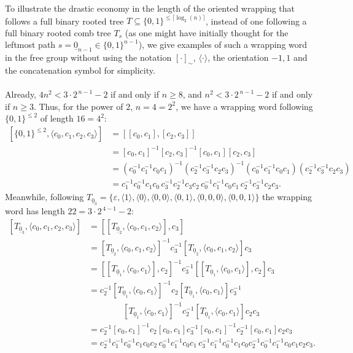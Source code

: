 \documentclass[11pt, a4paper, oneside]{article}
\theoremstyle{remark}
\theoremstyle{lemma}
\begin{document}
To illustrate the drastic economy in the length of the oriented wrapping that follows a full binary rooted tree \(T \subseteq \{0,1\}^{\leq \lceil \log_2(n) \rceil}\), instead of one following a full binary rooted comb tree \(T_s\) (as one might have initially thought for the leftmost path \(s = \underline{0}_{n-1} \in \{0,1\}^{n-1}\)), we give examples of such a wrapping word in the free group without using the notation \([\cdot]_{\sim}\), \(\langle \cdot \rangle\), the orientation \(-1,1\) and the concatenation symbol for simplicity. 
\\\\
Already, \(4n^2 < 3 \cdot 2^{\,n-1} - 2\) if and only if \(n \geq 8\), and \(n^2 < 3 \cdot 2^{\,n-1} - 2\) if and only if \(n \geq 3\). Thus, for the power of \(2\), \(n = 4 = 2^2\), we have a wrapping word following \(\{0,1\}^{\leq 2}\) of length \(16 = 4^2\):
\begin{align*}
\left[\{0,1\}^{\leq 2}, \langle c_0,c_1,c_2,c_3\rangle\right] 
&= [[c_0,c_1],[c_2,c_3]] \\
&= [c_0,c_1]^{-1}[c_2,c_3]^{-1}[c_0,c_1][c_2,c_3] \\
&= (c_0^{-1}c_1^{-1}c_0c_1)^{-1}(c_2^{-1}c_3^{-1}c_2c_3)^{-1}(c_0^{-1}c_1^{-1}c_0c_1)(c_2^{-1}c_3^{-1}c_2c_3) \\
&= c_1^{-1}c_0^{-1}c_1c_0 \, c_3^{-1}c_2^{-1}c_3c_2 \, c_0^{-1}c_1^{-1}c_0c_1 \, c_2^{-1}c_3^{-1}c_2c_3.
\end{align*}
Meanwhile, following \(T_{\underline{0}_{3}} = \{\varepsilon, \langle 1 \rangle, \langle 0 \rangle, \langle 0,0 \rangle, \langle 0,1 \rangle, \langle 0,0,0 \rangle, \langle 0,0,1 \rangle\}\) the wrapping word has length \(22 = 3 \cdot 2^{\,4-1} - 2\):
\begin{align*}
\left[T_{\underline{0}_{3}}, \langle c_0,c_1,c_2,c_3 \rangle \right] 
&= \left[\left[T_{\underline{0}_{2}}, \langle c_0,c_1,c_2 \rangle \right], c_3 \right] \\
&= \left[T_{\underline{0}_{2}}, \langle c_0,c_1,c_2 \rangle \right]^{-1} c_3^{-1} \left[T_{\underline{0}_{2}}, \langle c_0,c_1,c_2 \rangle \right] c_3 \\
&= \left[\left[T_{\underline{0}_{1}}, \langle c_0,c_1 \rangle \right], c_2 \right]^{-1} c_3^{-1} \left[\left[T_{\underline{0}_{1}}, \langle c_0,c_1 \rangle \right], c_2 \right] c_3 \\
&= c_2^{-1} \left[T_{\underline{0}_{1}}, \langle c_0,c_1 \rangle \right]^{-1} c_2 \left[T_{\underline{0}_{1}}, \langle c_0,c_1 \rangle \right] c_3^{-1}\\&\quad\quad\quad\quad \left[T_{\underline{0}_{1}}, \langle c_0,c_1 \rangle \right]^{-1} c_2^{-1} \left[T_{\underline{0}_{1}}, \langle c_0,c_1 \rangle \right] c_2 c_3 \\
&= c_2^{-1} \left[c_0,c_1 \right]^{-1} c_2 \left[c_0,c_1 \right] c_3^{-1} \left[c_0,c_1 \right]^{-1} c_2^{-1} \left[c_0,c_1 \right] c_2 c_3 \\
&= c_2^{-1} c_1^{-1} c_0^{-1} c_1 c_0 c_2 \, c_0^{-1} c_1^{-1} c_0 c_1 \, c_3^{-1} c_1^{-1} c_0^{-1} c_1 c_0 c_2^{-1} c_0^{-1} c_1^{-1} c_0 c_1 c_2 c_3.
\end{align*}
\end{document}
